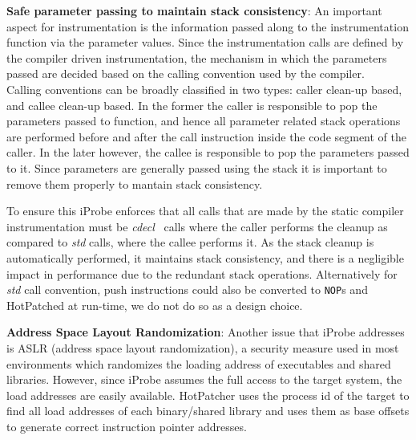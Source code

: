 \indent \textbf{Safe parameter passing to maintain stack consistency}: \quad
An important aspect for instrumentation is the information passed along to the instrumentation function via the parameter values. 
Since the instrumentation calls are defined by the compiler driven instrumentation, the mechanism in which the parameters passed are decided based on the calling convention used by the compiler. \\
Calling conventions can be broadly classified in two types: caller clean-up based, and callee clean-up based. 
In the former the caller is responsible to pop the parameters passed to function, and hence all parameter related stack operations are performed before and after the call instruction inside the code segment of the caller.
In the later however, the callee is responsible to pop the parameters passed to it.
Since parameters are generally passed using the stack it is important to remove them properly to mantain stack consistency. 

To ensure this iProbe enforces that all calls that are made by the static compiler instrumentation must be \emph{cdecl}~\cite{cdecl} calls where the caller performs the cleanup as compared to \emph{std} calls, where the callee performs it. 
As the stack cleanup is automatically performed, it maintains stack consistency, and there is a negligible impact in performance due to the redundant stack operations. 
Alternatively for \emph{std} call convention, push instructions could also be converted to \texttt{NOP}s and HotPatched at run-time, we do not do so as a design choice. 

\indent \textbf{Address Space Layout Randomization}: \quad
Another issue that iProbe addresses is ASLR (address space layout randomization), a security measure used in most environments which randomizes the loading address of executables and shared libraries. 
However, since iProbe assumes the full access to the target system, the load addresses are easily available. 
HotPatcher uses the process id of the target to find all load addresses of each binary/shared library and uses them as base offsets to generate correct instruction pointer addresses. 




